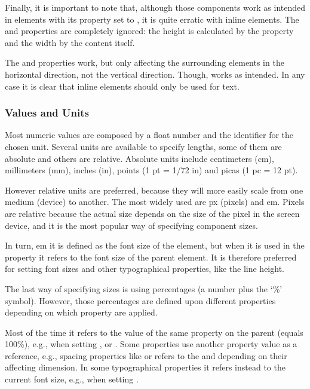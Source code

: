 Finally, it is important to note that, although those components work as intended in elements with its  property set to , it is quite erratic with inline elements.
The  and  properties are completely ignored: the height is calculated by the  property and the width by the content itself.

The  and  properties work, but only affecting the surrounding elements in the horizontal direction, not the vertical direction.
Though,  works as intended.
In any case it is clear that inline elements should only be used for text.


\subsubsection{Values and Units} %
\label{ssub:valuesunits}

Most numeric values are composed by a float number and the identifier for the chosen unit.
Several units are available to specify lengths, some of them are absolute and others are relative.
Absolute units include centimeters (cm), millimeters (mm), inches (in), points (1 pt = 1/72 in) and picas (1 pc = 12 pt).

However relative units are preferred, because they will more easily scale from one medium (device) to another.
The most widely used are px (pixels) and em.
Pixels are relative because the actual size depends on the size of the pixel in the screen device, and it is the most popular way of specifying component sizes.

In turn, em it is defined as the font size of the element, but when it is used in the  property it refers to the font size of the parent element.
It is therefore preferred for setting font sizes and other typographical properties, like the line height.

The last way of specifying sizes is using percentages (a number plus the `\%' symbol).
However, those percentages are defined upon different properties depending on which property are applied.

Most of the time it refers to the value of the same property on the parent (equals 100\%), e.g., when setting ,  or .
Some properties use another property value as a reference, e.g., spacing properties like  or  refers to the  and  depending on their affecting dimension.
In some typographical properties it refers instead to the current font size, e.g., when setting .

